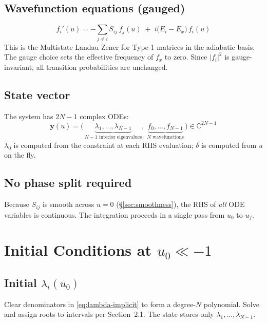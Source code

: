 \documentclass[11pt]{article}
\begin{document}
\subsection{Wavefunction equations (gauged)}

\begin{equation}\label{eq:f-gauged}
  \boxed{\;
    f_i'(u) = -\sum_{j \neq i} S_{ij}\, f_j(u) \;+\; i\bigl(E_i - E_x\bigr)\, f_i(u)
  \;}
\end{equation}
This is the Multistate Landau Zener for Type-1 matrices in the adiabatic basis. The gauge choice sets the effective frequency of $f_x$ to zero.  Since $|f_i|^2$ is gauge-invariant, all transition probabilities are unchanged.

\subsection{State vector}

The system has $2N{-}1$ complex ODEs:
\[
  \mathbf{y}(u) = \bigl(\,
    \underbrace{\lambda_1, \dots, \lambda_{N-1}}_{N-1\text{ interior eigenvalues}},\;
    \underbrace{f_0, \dots, f_{N-1}}_{N\text{ wavefunctions}}
  \,\bigr) \in \mathbb{C}^{2N-1}
\]
$\lambda_0$ is computed from the constraint at each RHS evaluation; $\delta$ is computed from $u$ on the fly.

\subsection{No phase split required}

Because $S_{ij}$ is smooth across $u=0$ (\S\ref{sec:smoothness}), the RHS of \emph{all} ODE variables is continuous.  The integration proceeds in a single pass from $u_0$ to $u_f$.

\section{Initial Conditions at $u_0 \ll -1$}

\subsection{Initial $\lambda_i(u_0)$}

Clear denominators in \eqref{eq:lambda-implicit} to form a degree-$N$ polynomial.
Solve and assign roots to intervals per Section~2.1.  The state stores only $\lambda_1,\dots,\lambda_{N-1}$.
\end{document}
